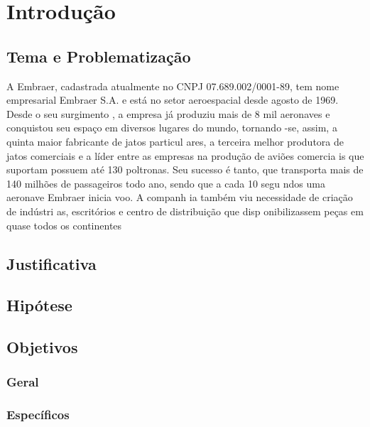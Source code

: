 
\chapter{Introdução}

\section{Tema e Problematização}
A Embraer,
cadastrada atualmente no CNPJ 07.689.002/0001-89,
tem nome empresarial Embraer S.A. e está no setor aeroespacial desde agosto de 1969. Desde o seu surgimento
, a empresa já produziu mais de 8 mil aeronaves e conquistou seu espaço em diversos lugares do mundo, tornando
-se, assim, a quinta maior fabricante de jatos particul
ares, a terceira melhor produtora de jatos comerciais e 
a líder entre as empresas na produção de aviões comercia
is que suportam possuem até 130 poltronas. Seu sucesso é
tanto, que transporta mais de 140 milhões de 
passageiros todo ano, sendo que a cada 10 segu
ndos uma aeronave Embraer inicia voo. A companh
ia também viu necessidade de criação de indústri
as, escritórios e centro de distribuição que disp
onibilizassem peças em quase todos os continentes

\section{Justificativa}
\lipsum[1]

\section{Hipótese}
\lipsum[1]

\section{Objetivos}
\subsection{Geral}
\subsection{Específicos}
\lipsum[1]




